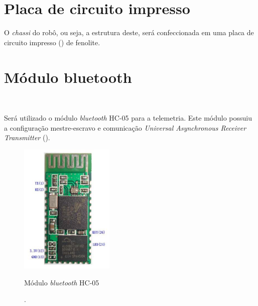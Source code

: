 \vspace{0.5cm}
\section{Placa de circuito impresso} \label{cap:chassi}

O \textit{chassi} do robô, ou seja, a estrutura deste, será confeccionada em uma placa de 
circuito impresso () de fenolite.



\vspace{0.5cm}
\section{Módulo bluetooth} \label{cap:bluetooth}\

Será utilizado o módulo \textit{bluetooth} %
HC-05 para a telemetria. Este módulo possuiu a configuração 
mestre-escravo e comunicação \textit{Universal Asynchronous Receiver Transmitter} 
().

\begin{figure}[h!]
 \centering
 \captionsetup{width=0.4\textwidth,font=footnotesize,textfont=bf}
 \includegraphics[width=0.4\textwidth,height=0.8\textheight,keepaspectratio]{figuras/hc05.png}
 \caption{Módulo \textit{bluetooth} HC-05 \label{fig:hc05}}
 \vspace{-0.3cm}
 \caption*{\cite{hc05}}.
\end{figure}



